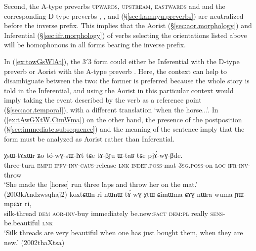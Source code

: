 Second, the A-type preverbs  \textsc{upwards},  \textsc{upstream},  \textsc{eastwards} and  and the corresponding D-type preverbs , ,  and  (§\ref{sec:kamnyu.preverbs}) are neutralized before the inverse prefix. This implies that the Aorist (§\ref{sec:aor.morphology}) and Inferential (§\ref{sec:ifr.morphology}) of verbs selecting the orientations listed above will be homophonous in all forms bearing the inverse prefix.

In (\ref{ex:towGsWlAt}), the 3$'$\fl{}3 form  could either be Inferential  with the D-type preverb  or Aorist  with the A-type preverb . Here, the context can help to disambiguate between the two: the former is preferred because the whole story is told in the Inferential, and using the Aorist in this particular context would imply taking the event described by the verb as a reference point (§\ref{sec:aor.temporal}), with a different translation `when the horse...'. In (\ref{ex:tAwGXtW.CimWma}) on the other hand, the presence of the postposition  (§\ref{sec:immediate.subsequence}) and the meaning of the sentence imply that the form  must be analyzed as Aorist rather than Inferential.

\begin{exe}
	\ex   \label{ex:to.tA.ambiguity}
	\begin{xlist}
		\ex   \label{ex:towGsWlAt}
		\gll χsɯ-tɤxɯr ʑo tó-wɣ-sɯ-lɤt tɕe tɤ-βɟu ɯ-taʁ tɕe pjɤ́-wɣ-βde. \\
		three-turn \textsc{emph} \textsc{ipfv}-\textsc{inv}-\textsc{caus}-release \textsc{lnk} \textsc{indef}.\textsc{poss}-mat \textsc{3sg}.\textsc{poss}-on \textsc{loc} \textsc{ifr}-\textsc{inv}-throw \\
		\glt `She made the [horse] run three laps and throw her on the mat.' (2003kAndzwsqhaj2)
		\ex   \label{ex:tAwGXtW.CimWma}
		\gll  koxtɕɯn-ri nɯnɯ tɤ́-wɣ-χtɯ ɕimɯma ɕɤɣ nɯra wuma ɲɯ-mpɕɤr ri, \\
		silk-thread \textsc{dem} \textsc{aor}-\textsc{inv}-buy immediately be.new:\textsc{fact} \textsc{dem}:\textsc{pl} really \textsc{sens}-be.beautiful \textsc{lnk} \\
		\glt `Silk threads are very beautiful when one has just bought them, when they are new.' (2002thaXtsa)
	\end{xlist}
\end{exe}

